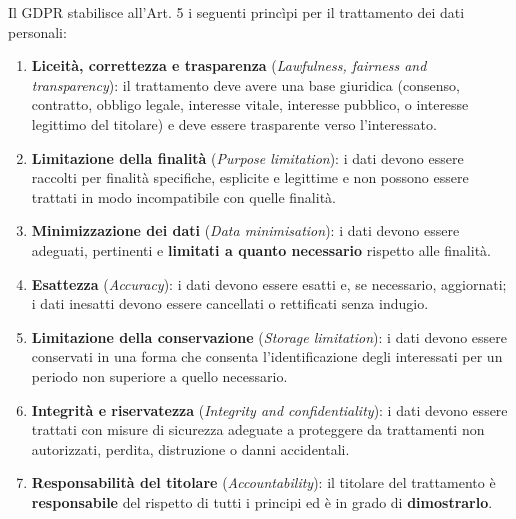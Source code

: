 \documentclass[a4paper,11pt]{article}
\begin{document}
\begin{definizione}
Il GDPR stabilisce all'Art. 5 i seguenti princìpi per il trattamento dei dati personali:
\begin{enumerate}
  \item \textbf{Liceità, correttezza e trasparenza} (\emph{Lawfulness, fairness and transparency}): il trattamento deve avere una base giuridica (consenso, contratto, obbligo legale, interesse vitale, interesse pubblico, o interesse legittimo del titolare) e deve essere trasparente verso l'interessato.
  \item \textbf{Limitazione della finalità} (\emph{Purpose limitation}): i dati devono essere raccolti per finalità specifiche, esplicite e legittime e non possono essere trattati in modo incompatibile con quelle finalità.
  \item \textbf{Minimizzazione dei dati} (\emph{Data minimisation}): i dati devono essere adeguati, pertinenti e \textbf{limitati a quanto necessario} rispetto alle finalità.
  \item \textbf{Esattezza} (\emph{Accuracy}): i dati devono essere esatti e, se necessario, aggiornati; i dati inesatti devono essere cancellati o rettificati senza indugio.
  \item \textbf{Limitazione della conservazione} (\emph{Storage limitation}): i dati devono essere conservati in una forma che consenta l'identificazione degli interessati per un periodo non superiore a quello necessario.
  \item \textbf{Integrità e riservatezza} (\emph{Integrity and confidentiality}): i dati devono essere trattati con misure di sicurezza adeguate a proteggere da trattamenti non autorizzati, perdita, distruzione o danni accidentali.
  \item \textbf{Responsabilità del titolare} (\emph{Accountability}): il titolare del trattamento è \textbf{responsabile} del rispetto di tutti i principi ed è in grado di \textbf{dimostrarlo}.
\end{enumerate}
\end{definizione}
\end{document}
